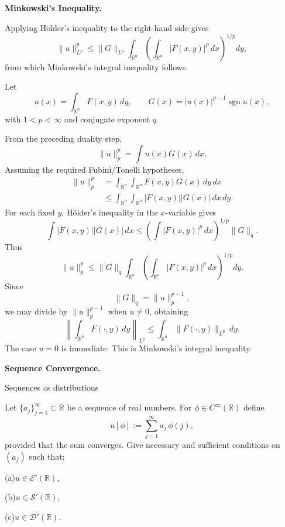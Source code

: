 \begin{problem}[CP-II-0248]
\label{prob:cp-ii-0248}
\textbf{Minkowski's Inequality.}

\hspace*{1.5em}Applying Hölder's inequality to the right-hand side gives
	\[
	\|u\|_{L^p}^p
	\le
	\|G\|_{L^q}
	\int_{\mathbb{R}^n}
	\left(
	\int_{\mathbb{R}^n} |F(x,y)|^p \, dx
	\right)^{1/p} dy,
	\]
	from which Minkowski's integral inequality follows.

\bigskip
\end{problem}

\begin{solution}
Let
\[
u(x)=\int_{\mathbb R^n}F(x,y)\,dy,
\qquad
G(x)=|u(x)|^{p-1}\operatorname{sgn}u(x),
\]
with \(1<p<\infty\) and conjugate exponent \(q\).

From the preceding duality step,
\[
\|u\|_p^p
=
\int u(x)G(x)\,dx.
\]
Assuming the required Fubini/Tonelli hypotheses,
\[
\begin{aligned}
\|u\|_p^p
&=
\int_{\mathbb R^n}
\int_{\mathbb R^n}
F(x,y)G(x)\,dy\,dx\\
&\le
\int_{\mathbb R^n}
\int_{\mathbb R^n}
|F(x,y)||G(x)|\,dx\,dy.
\end{aligned}
\]
For each fixed \(y\), Hölder's inequality in the \(x\)-variable gives
\[
\int
|F(x,y)||G(x)|\,dx
\le
\left(
\int|F(x,y)|^p\,dx
\right)^{1/p}
\|G\|_q.
\]
Thus
\[
\|u\|_p^p
\le
\|G\|_q
\int_{\mathbb R^n}
\left(
\int_{\mathbb R^n}|F(x,y)|^p\,dx
\right)^{1/p}dy.
\]
Since
\[
\|G\|_q=\|u\|_p^{p-1},
\]
we may divide by \(\|u\|_p^{p-1}\) when \(u\neq0\), obtaining
\[
\boxed{
\left\|
\int_{\mathbb R^n}F(\cdot,y)\,dy
\right\|_{L^p}
\le
\int_{\mathbb R^n}
\|F(\cdot,y)\|_{L^p}\,dy.
}
\]
The case \(u=0\) is immediate. This is Minkowski's integral inequality.
\end{solution}


\begin{problem}[CP-II-0250]
\label{prob:cp-ii-0250}
\textbf{Sequence Convergence.}

\hspace*{1.5em}Sequences as distributions

Let $\{a_j\}_{j=1}^\infty\subset\mathbb{R}$ be a sequence of real
numbers. For $\phi\in C^\infty(\mathbb{R})$ define
\[
u[\phi] := \sum_{j=1}^\infty a_j\,\phi(j),
\]
provided that the sum converges. Give necessary and sufficient
conditions on $(a_j)$ such that:

	\par\noindent (a)\quad $u\in\mathcal{E}'(\mathbb{R})$,
	\par\noindent (b)\quad $u\in\mathcal{S}'(\mathbb{R})$,
	\par\noindent (c)\quad $u\in\mathcal{D}'(\mathbb{R})$.
\end{problem}

